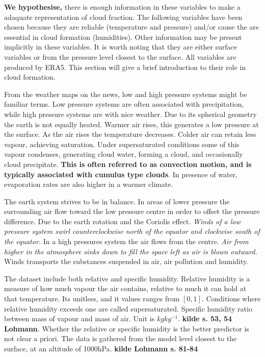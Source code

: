 \textbf{We hypothesise,} there is enough information in these variables to make a adaquate representation of cloud fraction. The following variables have been chosen because they are reliable (temperature and pressure) and/or cause the are essential in cloud formation (humidities). Other information may be present implicitly in these variables. It is worth noting that they are either surface variables or from the pressure level closest to the surface. All variables are produced by ERA5. This section will give a brief introduction to their role in cloud formation. 

From the weather maps on the news, low and high pressure systems might be familiar terms. Low pressure systems are often associated with precipitation, while high pressure systems are with nice weather. Due to its spherical geometry the earth is not equally heated. Warmer air rises, this generates a low pressure at the surface. As the air rises the temperature decreases. Colder air can retain less vapour, achieving saturation. Under supersaturated conditions some of this vapour condenses, generating cloud water, forming a cloud, and occasionally cloud precipitate. \textbf{This is often referred to as convection motion, and is typically associated with cumulus type clouds}. In presence of water, evaporation rates are also higher in a warmer climate. 

The earth system strives to be in balance. In areas of lower pressure the surrounding air flow toward the low pressure centre in order to offset the pressure difference. Due to the earth rotation and the Coriolis effect. \textit{Winds of a low pressure system swirl counterclockwise north of the equator and clockwise south of the equator.} In a high pressures system the air flows from the centre. \textit{Air from higher in the atmosphere sinks down to fill the space left as air is blown outward.} Winds transports the substances suspended in air, air pollution and humidity.

The dataset include both relative and specific humidity. Relative humidity is a measure of how much vapour the air contains, relative to much it can hold at that temperature. Its unitless, and it values ranges from $\left[ 0, 1 \right]$.  Conditions where relative humidity exceeds one are called supersaturated. Specific humidity ratio between mass of vapour and mass of air. Unit is $kg kg^{-1}$. \textbf{kilde s. 53, 54 Lohmann}. Whether the relative or specific humidity is the better predictor is not clear a priori. The data is gathered from the model level closest to the surface, at an altitude of 1000hPa. \textbf{kilde Lohmann s. 81-84}

